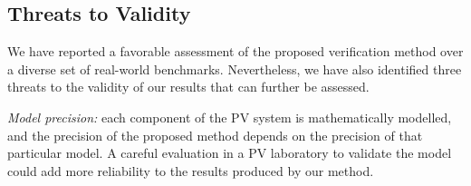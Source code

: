 \documentclass[journal]{IEEEtran}
\begin{document}
%
%
%
\subsection{Threats to Validity}
We have reported a favorable assessment of the proposed verification method over a diverse set of real-world benchmarks. Nevertheless, we have also identified three threats to the validity of our results that can further be assessed.

\textit{Model precision:} each component of the PV system is mathematically modelled, and the precision of the proposed method depends on the precision of that particular model. A careful evaluation in a PV laboratory to validate the model could add more reliability to the results produced by our method.
\end{document}
